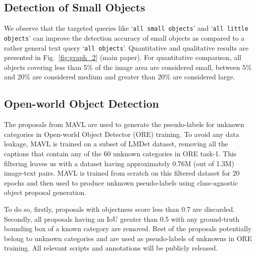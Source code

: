 \documentclass[runningheads]{llncs}
\newcommand{\txt}[1]{{\texttt{#1}}}
\begin{document}
\subsection{Detection of Small Objects}
We observe that the targeted queries like ‘\txt{all small objects}’ and ‘\txt{all little objects}’ can improve the detection accuracy of small objects as compared to a rather general text query ‘\txt{all objects}’. Quantitative and qualitative results are presented in Fig.~\ref{fig:graph_2} (main paper). For quantitative comparison, all objects covering less than 5\% of the image area are considered small, between 5\% and 20\% are considered medium and greater than 20\% are considered large. 
\subsection{Open-world Object Detection}
\label{appendix:ore}
The proposals from MAVL are used to generate the pseudo-labels for unknown categories in Open-world Object Detector (ORE) \cite{joseph2021towards} training. To avoid any data leakage, MAVL is trained on a subset of LMDet dataset, removing all the captions that contain any of the 60 unknown categories in ORE task-1. This filtering leaves us with a dataset having approximately 0.76M (out of 1.3M) image-text pairs. MAVL is trained from scratch on this filtered dataset for 20 epochs and then used to produce unknown pseudo-labels using class-agnostic object proposal generation.

To do so, firstly, proposals with objectness score less than 0.7 are discarded. Secondly, all proposals having an IoU greater than 0.5 with any ground-truth bounding box of a known category are removed. Rest of the proposals potentially belong to unknown categories and are used as pseudo-labels of unknowns in ORE training. All relevant scripts and annotations will be publicly released.
\end{document}
